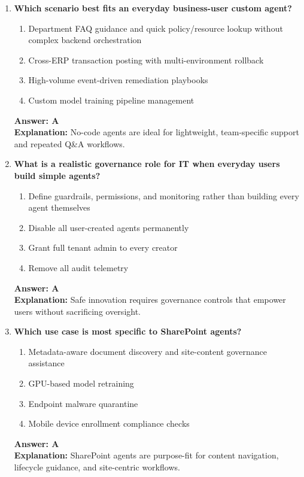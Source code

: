 \documentclass[10pt]{article}
\begin{document}
\begin{enumerate}[leftmargin=*]
\item \textbf{Which scenario best fits an everyday business-user custom agent?}
\begin{enumerate}[label=\Alph*.]
  \item Department FAQ guidance and quick policy/resource lookup without complex backend orchestration
  \item Cross-ERP transaction posting with multi-environment rollback
  \item High-volume event-driven remediation playbooks
  \item Custom model training pipeline management
\end{enumerate}
\textbf{Answer: A}\\
\textbf{Explanation:} No-code agents are ideal for lightweight, team-specific support and repeated Q\&A workflows.

\item \textbf{What is a realistic governance role for IT when everyday users build simple agents?}
\begin{enumerate}[label=\Alph*.]
  \item Define guardrails, permissions, and monitoring rather than building every agent themselves
  \item Disable all user-created agents permanently
  \item Grant full tenant admin to every creator
  \item Remove all audit telemetry
\end{enumerate}
\textbf{Answer: A}\\
\textbf{Explanation:} Safe innovation requires governance controls that empower users without sacrificing oversight.

\item \textbf{Which use case is most specific to SharePoint agents?}
\begin{enumerate}[label=\Alph*.]
  \item Metadata-aware document discovery and site-content governance assistance
  \item GPU-based model retraining
  \item Endpoint malware quarantine
  \item Mobile device enrollment compliance checks
\end{enumerate}
\textbf{Answer: A}\\
\textbf{Explanation:} SharePoint agents are purpose-fit for content navigation, lifecycle guidance, and site-centric workflows.


\end{enumerate}
\end{document}
